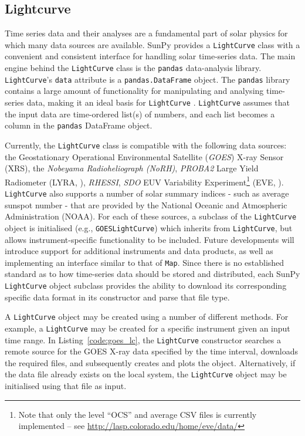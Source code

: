 \subsection{Lightcurve}\label{ssec:lightcurve}

Time series data and their analyses are a fundamental part of solar
physics for which many data sources are available.
SunPy provides a \texttt{LightCurve} class
with a convenient and consistent interface for handling solar time-series
data.  The main engine behind the \texttt{LightCurve} class is
the {\texttt{pandas}} data-analysis library.  
\texttt{LightCurve}'s \texttt{data} attribute is a \texttt{pandas.DataFrame} 
object. The \texttt{pandas} library contains a large amount
of functionality for manipulating and analysing time-series data,
making it an ideal basis for \texttt{LightCurve} \citep{mckinney2012}.  \texttt{LightCurve}
assumes that the input data are time-ordered list(s) of numbers, and each
list becomes a column in the \texttt{pandas} DataFrame object.

Currently, the \texttt{LightCurve} class is compatible with the
following data sources: the Geostationary Operational Environmental
Satellite (\textit{GOES}) X-ray Sensor (XRS), the \textit{Nobeyama
  Radioheliograph (NoRH)}, \textit{PROBA2} Large Yield Radiometer
(LYRA, \citealt{2013SoPh..286...21D}), \textit{RHESSI},
\textit{SDO} EUV Variability Experiment\footnote{Note that only the level ``OCS'' and average
  CSV files is currently implemented -- see
  \url{http://lasp.colorado.edu/home/eve/data/}} (EVE, \citealt{2012SoPh..275..115W}). \texttt{LightCurve}
also supports a number of solar summary indices - such as average
sunspot number - that are provided by the National Oceanic and
Atmospheric Administration (NOAA).  For each of these sources, a
subclass of the \texttt{LightCurve} object is initialised (e.g.,
\texttt{GOESLightCurve}) which inherits from \texttt{LightCurve}, but
allows instrument-specific functionality to be included.  Future
developments will introduce support for additional instruments and
data products, as well as implementing an interface similar to that of
\texttt{Map}.  Since there is no established standard as to how
time-series data should be stored and distributed, each SunPy
\texttt{LightCurve} object subclass provides the ability to download
its corresponding specific data format in its constructor and parse
that file type.

A \texttt{LightCurve} object may be created using a number of different methods. 
For example, a \texttt{LightCurve} may be created for a specific instrument given
an input time range. In Listing~\ref{code:goes_lc}, 
the \texttt{LightCurve} constructor searches a remote source for the GOES X-ray 
data specified by the time interval, downloads the required files, and 
subsequently creates and plots the object. Alternatively, if the data file 
already exists on the local system, the \texttt{LightCurve} object may be 
initialised using that file as input.

